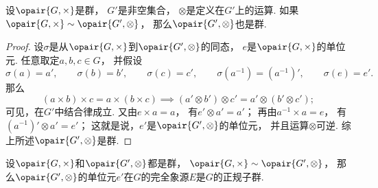 \begin{theorem}\label{theorem:抽象代数.群的同态象是群}
设\(\opair{G,\times}\)是群，
\(G'\)是非空集合，
\(\otimes\)是定义在\(G'\)上的运算.
如果\(\opair{G,\times}\Homomorphism\opair{G',\otimes}\)，
那么\(\opair{G',\otimes}\)也是群.
\begin{proof}
设\(\sigma\)是从\(\opair{G,\times}\)到\(\opair{G',\otimes}\)的同态，
\(e\)是\(\opair{G,\times}\)的单位元.
任意取定\(a,b,c\in G\)，
并假设\begin{equation*}
	\sigma(a)=a', \qquad
	\sigma(b)=b', \qquad
	\sigma(c)=c', \qquad
	\sigma(a^{-1})=(a^{-1})', \qquad
	\sigma(e)=e'.
\end{equation*}
那么\begin{equation*}
	(a \times b)\times c = a \times(b \times c)
	\implies
	(a' \otimes b')\otimes c' = a' \otimes(b' \otimes c');
\end{equation*}
可见，在\(G'\)中结合律成立.
又由\(e\times a=a\)，
有\(e'\otimes a'=a'\)；
再由\(a^{-1}\times a=e\)，
有\((a^{-1})'\otimes a'=e'\)；
这就是说，\(e'\)是\(\opair{G',\otimes}\)的单位元，
并且运算\(\otimes\)可逆.
综上所述\(\opair{G',\otimes}\)是群.
\end{proof}
\end{theorem}

\begin{theorem}
设\(\opair{G,\times}\)和\(\opair{G',\otimes}\)都是群，
\(\opair{G,\times}\Homomorphism\opair{G',\otimes}\)，
那么\(\opair{G',\otimes}\)的单位元\(e'\)在\(G\)的完全象源\(E\)是\(G\)的正规子群.
\end{theorem}
